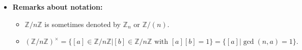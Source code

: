 \begin{itemize}
\begin{proof}
\begin{enumerate}
            Therefore, $i-j = qn$ so $n |i-j$.
        \end{enumerate}
    \end{proof}
    \begin{corollary}
        Let $G$ be a group and $a\in G$.
        
        \begin{enumerate}
            \item If $o(a)=\infty$, then $\dots,a^{-2},a^{-1},e,a,a^2,\dots$ are distinct (and $\langle a \rangle = \{a^n|n\in \mathbb{Z}\}$)
            \item If $o(a) = n < \infty$, then $e,a,\dots,a^{n-1}$ are distinct and $\langle a \rangle = \{e,a,\dots,a^{n-1}\}$.
        \end{enumerate}
    \end{corollary}
    \begin{corollary}
        Let $G$ be a group and $a\in G$. Then $o(a) = |\langle a \rangle |$ where $|\langle a \rangle | = \infty$ when $\langle a\rangle $ is infinite.
    \end{corollary}
    \begin{corollary}
        Let $G$ be a group and $a,b\in G$. If $ab=ba$ and $o(a),o(b) < \infty$, then
        \begin{equation}
            o(ab) | o(a)o(b)
        \end{equation}
    \end{corollary}
    \begin{proof}
        Suppose $ab=ba$ and $o(a),o(b)<\infty$. Since:
        \begin{align}
            (ab)^{o(a)o(b)} &= a^{o(a)o(b)}b^{o(a)o(b)} \\ 
            &= (a^{o(a)})^{o(b)}(b^{o(b)})^{o(a)} \\ 
            &= e^{o(b)}e^{o(a)} \\ 
            &= e
        \end{align}
        Therefore, $o(ab) | o(a)o(b)$.  
    \end{proof}
    \item \textbf{Remarks about notation:}
    \begin{itemize}
        \item $\mathbb{Z}/n\mathbb{Z}$ is sometimes denoted by $\mathbb{Z}_n$ or $\mathbb{Z}/(n)$.
        \item $(\mathbb{Z}/n\mathbb{Z})^\times = \{[a]\in \mathbb{Z}/n\mathbb{Z} | [b] \in \mathbb{Z}/n\mathbb{Z} \text{ with } [a][b] = 1\} = \{[a] | \gcd(n,a) = 1\}.$

\end{itemize}
\end{itemize}
